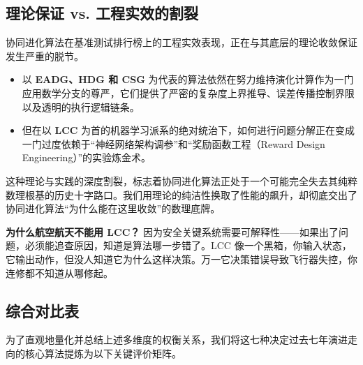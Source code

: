\subsection{理论保证 vs. 工程实效的割裂}
协同进化算法在基准测试排行榜上的工程实效表现，正在与其底层的理论收敛保证发生严重的脱节。

\begin{itemize}
    \item 以 \textbf{EADG、HDG 和 CSG} 为代表的算法依然在努力维持演化计算作为一门应用数学分支的尊严，它们提供了严密的复杂度上界推导、误差传播控制界限以及透明的执行逻辑链条。
    \item 但在以 \textbf{LCC} 为首的机器学习派系的绝对统治下，如何进行问题分解正在变成一门过度依赖于“神经网络架构调参”和“奖励函数工程（Reward Design Engineering）”的实验炼金术。
\end{itemize}

这种理论与实践的深度割裂，标志着协同进化算法正处于一个可能完全失去其纯粹数理根基的历史十字路口。我们用理论的纯洁性换取了性能的飙升，却彻底交出了协同进化算法“为什么能在这里收敛”的数理底牌。

\textbf{为什么航空航天不能用 LCC？} 因为安全关键系统需要可解释性——如果出了问题，必须能追查原因，知道是算法哪一步错了。LCC 像一个黑箱，你输入状态，它输出动作，但没人知道它为什么这样决策。万一它决策错误导致飞行器失控，你连修都不知道从哪修起。

\subsection{综合对比表}
为了直观地量化并总结上述多维度的权衡关系，我们将这七种决定过去七年演进走向的核心算法提炼为以下关键评价矩阵。


